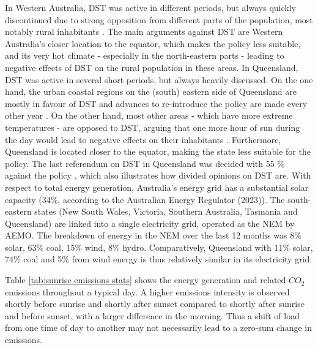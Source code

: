 In Western Australia, \ac{DST} was active in different periods, but always quickly discontinued due to strong opposition from different parts of the population, most notably rural inhabitants \parencite{pearce_great_2017}. The main arguments against \ac{DST} are Western Australia's closer location to the equator, which makes the policy less suitable, and its very hot climate - especially in the north-eastern parts - leading to negative effects of \ac{DST} on the rural population in these areas.  
In Queensland, \ac{DST} was active in several short periods, but always heavily discussed. On the one hand, the urban coastal regions on the (south) eastern side of Queensland are mostly in favour of \ac{DST} and advances to re-introduce the policy are made every other year \parencite{pearce_history_2017}. On the other hand, most other areas - which have more extreme temperatures -  are opposed to \ac{DST}, arguing that one more hour of sun during the day would lead to negative effects on their inhabitants \parencite{westcott_daylight_2010}. Furthermore, Queensland is located closer to the equator, making the state less suitable for the policy. The last referendum on \ac{DST} in Queensland was decided with 55 \% against the policy \parencite{queensland_referendum}, which also illustrates how divided opinions on \ac{DST} are.  
\newline
With respect to total energy generation, Australia's energy grid has a substantial solar capacity (34\%, according to the Australian Energy Regulator (2023)\nocite{state_of_the_market}). The south-eastern states (New South Wales, Victoria, Southern Australia, Tasmania and Queensland) are linked into a single electricity grid, operated as the \ac{NEM} by \ac{AEMO}. 
The breakdown of energy in the \ac{NEM} over the last 12 months was 8\% solar, 63\% coal, 15\% wind, 8\% hydro.
Comparatively, Queensland with 11\%  solar, 74\% coal and 5\% from wind energy \parencite{aemo_fuel_mix} is thus relatively similar in its electricity grid.

 Table \ref{tab:sunrise emissions stats} shows the energy generation and related $CO_2$ emissions throughout a typical day. A higher emissions intensity is observed shortly before sunrise and shortly after sunset compared to shortly after sunrise and before sunset, with a larger difference in the morning. Thus a shift of load from one time of day to another may not necessarily lead to a zero-sum change in emissions.

